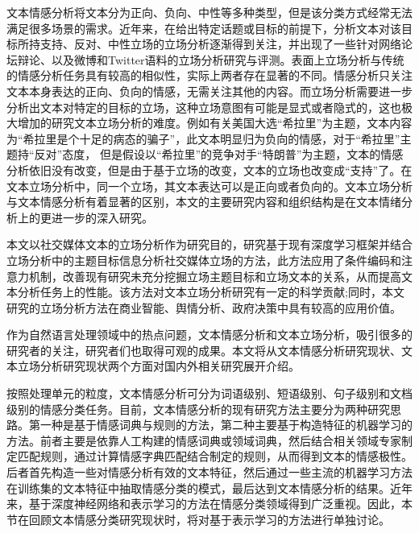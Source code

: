 文本情感分析将文本分为正向、负向、中性等多种类型，但是该分类方式经常无法满足很多场景的需求。近年来，在给出特定话题或目标的前提下，分析文本对该目标所持支持、反对、中性立场的立场分析逐渐得到关注，并出现了一些针对网络论坛辩论、以及微博和Twitter语料的立场分析研究与评测。表面上立场分析与传统的情感分析任务具有较高的相似性，实际上两者存在显著的不同。情感分析只关注文本本身表达的正向、负向的情感，无需关注其他的内容。而立场分析需要进一步分析出文本对特定的目标的立场，这种立场意图有可能是显式或者隐式的，这也极大增加的研究文本立场分析的难度。例如有关美国大选“希拉里”为主题，文本内容为“希拉里是个十足的病态的骗子”，此文本明显归为负向的情感，对于“希拉里”主题持“反对”态度， 但是假设以“希拉里”的竞争对手“特朗普”为主题，文本的情感分析依旧没有改变，但是由于基于立场的改变，文本的立场也改变成“支持”了。在文本立场分析中，同一个立场，其文本表达可以是正向或者负向的。文本立场分析与文本情感分析有着显著的区别，本文的主要研究内容和组织结构是在文本情绪分析上的更进一步的深入研究。

本文以社交媒体文本的立场分析作为研究目的，研究基于现有深度学习框架并结合立场分析中的主题目标信息分析社交媒体立场的方法，此方法应用了条件编码和注意力机制，改善现有研究未充分挖掘立场主题目标和立场文本的关系，从而提高文本分析任务上的性能。该方法对文本立场分析研究有一定的科学贡献;同时，本文研究的立场分析方法在商业智能、舆情分析、政府决策中具有较高的应用价值。



作为自然语言处理领域中的热点问题，文本情感分析和文本立场分析，吸引很多的研究者的关注，研究者们也取得可观的成果。本文将从文本情感分析研究现状、文本立场分析研究现状两个方面对国内外相关研究展开介绍。



按照处理单元的粒度，文本情感分析可分为词语级别、短语级别、句子级别和文档级别的情感分类任务。目前，文本情感分析的现有研究方法主要分为两种研究思路。第一种是基于情感词典与规则的方法，第二种主要基于构造特征的机器学习的方法。前者主要是依靠人工构建的情感词典或领域词典，然后结合相关领域专家制定匹配规则，通过计算情感字典匹配结合制定的规则，从而得到文本的情感极性。后者首先构造一些对情感分析有效的文本特征，然后通过一些主流的机器学习方法在训练集的文本特征中抽取情感分类的模式，最后达到文本情感分析的结果。近年来，基于深度神经网络和表示学习的方法在情感分类领域得到广泛重视。因此，本节在回顾文本情感分类研究现状时，将对基于表示学习的方法进行单独讨论。

